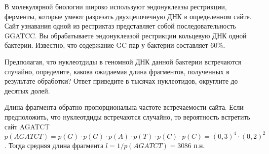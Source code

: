 
В молекулярной биологии широко используют
эндонуклеазы рестрикции, ферменты, которые умеют разрезать двухцепочечную ДНК в
определенном сайте. Сайт узнавания одной из рестриктаз представляет собой
последовательность GGATCC. Вы обрабатываете эндонуклеазой рестрикции кольцевую
ДНК одной бактерии. Известно, что содержание GC пар у бактерии составляет $60\%$.


Предполагая, что нуклеотдиды в геномной ДНК данной бактерии встречаются случайно, определите, какова ожидаемая длина фрагментов, полученных в результате обработки? Ответ
приведите в тысячах нуклеотидов, 
округлите до десятых долей.

\solutionSection

Длина фрагмента обратно пропорциональна частоте встречаемости сайта. 
Если предположить, что нуклеотдиды встречаются случайно, то вероятность встретить сайт 
AGATCT $p(AGATCT)=p(G) \cdot p(G) \cdot p(A) \cdot p(T) \cdot p(C) \cdot p(C)= (0,3)^4 \cdot (0,2)^2$. 
Тогда средняя длина фрагмента $l=1/p(AGATCT) =  3086$ п.н.

